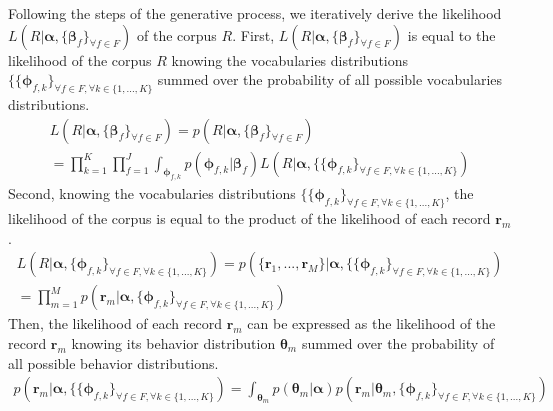 Following the steps of the generative process, we iteratively derive the likelihood $L(R|\boldsymbol{\alpha}, \{\boldsymbol{\beta }_{f}\}_{\forall f\in F})$ of the corpus $R$. First, $L(R|\boldsymbol{\alpha},\{\boldsymbol{\beta }_{f}\}_{\forall f\in F})$ is equal to the likelihood of the corpus $R$ knowing the vocabularies distributions $\{\{\boldsymbol{\phi }_{f,k}\}_{\forall f \in F, \forall k\in\{1,...,K\}}$ summed over the probability of all possible vocabularies distributions.
\begin{equation} \label{eqghcmmdtlik}
\begin{split} 
L(R|\boldsymbol{\alpha}, \{\boldsymbol{\beta }_{f}\}_{\forall f\in F})=p(R|\boldsymbol{\alpha},\{\boldsymbol{\beta }_{f}\}_{\forall f\in F})
\\=\prod_{k=1}^{K}\prod_{f=1}^{J}\int_{\boldsymbol{\phi}_{f,k}}p(\boldsymbol{\phi }_{f,k}|\boldsymbol{\beta }_{f})L(R|\boldsymbol{\alpha}, \{\{\boldsymbol{\phi }_{f,k}\}_{\forall f \in F, \forall k\in\{1,...,K\}})
\end{split} 
\end{equation}
Second, knowing the vocabularies distributions $\{\{\boldsymbol{\phi }_{f,k}\}_{\forall f \in F, \forall k\in\{1,...,K\}}$, the likelihood of the corpus is equal to the product of the likelihood of each record $\mathbf{r}_{m}$.
\begin{equation}
\begin{split} 
L(R|\boldsymbol{\alpha}, \{\boldsymbol{\phi }_{f,k}\}_{\forall f \in F, \forall k\in\{1,...,K\}})=p(\{\mathbf{r}_{1},...,\mathbf{r}_{M}\}|\boldsymbol{\alpha}, \{\{\boldsymbol{\phi }_{f,k}\}_{\forall f \in F, \forall k\in\{1,...,K\}})
\\=\prod_{m=1}^{M}p(\mathbf{r}_{m}|\boldsymbol{\alpha}, \{\boldsymbol{\phi}_{f,k}\}_{\forall f \in F, \forall k\in\{1,...,K\}})
\end{split} 
\end{equation}
Then, the likelihood of each record $\mathbf{r}_{m}$ can be expressed as the likelihood of the record $\mathbf{r}_{m}$ knowing its behavior distribution $\boldsymbol{\theta}_{m}$ summed over the probability of all possible behavior distributions.
\begin{equation}
\begin{split} 
p(\mathbf{r}_{m}|\boldsymbol{\alpha}, \{\{\boldsymbol{\phi }_{f,k}\}_{\forall f \in F, \forall k\in\{1,...,K\}})=\int_{\boldsymbol{\theta}_{m} }p(\boldsymbol{\theta}_{m}|\boldsymbol{\alpha })p(\mathbf{r}_{m}|\boldsymbol{\theta }_{m}, \{\boldsymbol{\phi}_{f,k}\}_{\forall f \in F, \forall k\in\{1,...,K\}})
\end{split} 
\end{equation}

